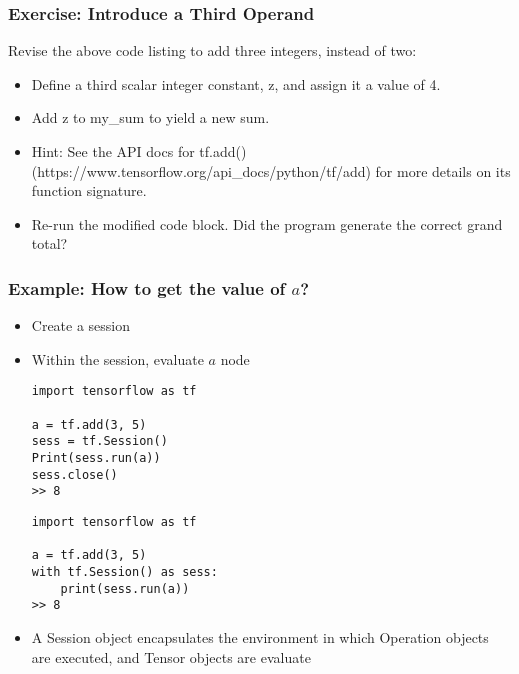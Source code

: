 \begin{frame}[fragile] \frametitle{Exercise: Introduce a Third Operand}
Revise the above code listing to add three integers, instead of two:
\begin{itemize}
\item Define a third scalar integer constant, z, and assign it a value of 4.
\item Add z to my\_sum to yield a new sum.
\item 
Hint: See the API docs for tf.add() (https://www.tensorflow.org/api\_docs/python/tf/add) for more details on its function signature.
\item 
Re-run the modified code block. Did the program generate the correct grand total?
\end{itemize}
\end{frame}


\begin{frame}[fragile] \frametitle{Example: How to get the value of $a$?}
\begin{itemize}
\item Create a session
\item Within the session, evaluate $a$ node
\begin{minipage}[t]{0.48\linewidth}
\begin{lstlisting}
import tensorflow as tf

a = tf.add(3, 5)
sess = tf.Session()
Print(sess.run(a))
sess.close()
>> 8
\end{lstlisting}
\end{minipage}
\hfill
\begin{minipage}[t]{0.48\linewidth}
\begin{lstlisting}
import tensorflow as tf

a = tf.add(3, 5)
with tf.Session() as sess:
    print(sess.run(a))
>> 8
\end{lstlisting}
\end{minipage}
\item A Session object encapsulates the environment in which Operation objects are executed, and Tensor objects are evaluate
\end{itemize}
\end{frame}

